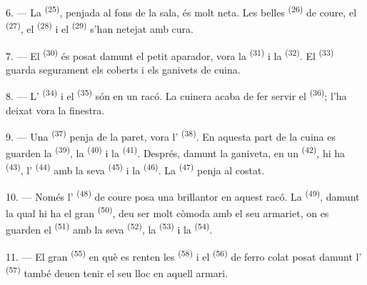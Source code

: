 \VUsaut{4.0mm}
\VUsaut{3.0mm}

6. --- La  \textsuperscript{(25)}, penjada al fons de la
sala, és molt neta. Les belles  \textsuperscript{(26)} de coure,
el  \textsuperscript{(27)}, el 
\textsuperscript{(28)} i el  \textsuperscript{(29)} s'han netejat
amb cura.

7. --- El  \textsuperscript{(30)} és posat damunt el petit aparador,
vora la  \textsuperscript{(31)} i la 
\textsuperscript{(32)}. El  \textsuperscript{(33)} guarda
segurament els coberts i els ganivets de cuina.

8. --- L' \textsuperscript{(34)} i el 
\textsuperscript{(35)} són en un racó. La cuinera acaba de fer servir el
 \textsuperscript{(36)}; l'ha deixat vora la finestra.

9. --- Una  \textsuperscript{(37)} penja de la paret,
vora l' \textsuperscript{(38)}. En aquesta part de la cuina es
guarden la  \textsuperscript{(39)}, la 
\textsuperscript{(40)} i la  \textsuperscript{(41)}.
Després, damunt la ganiveta, en un  \textsuperscript{(42)}, hi
ha  \textsuperscript{(43)}, l'
\textsuperscript{(44)} amb la seva  \textsuperscript{(45)} i la
 \textsuperscript{(46)}. La 
\textsuperscript{(47)} penja al costat.

10. --- Només l' \textsuperscript{(48)} de coure posa una brillantor
en aquest racó. La  \textsuperscript{(49)}, damunt la qual hi ha el
gran  \textsuperscript{(50)}, deu ser molt còmoda amb el seu
armariet, on es guarden el  \textsuperscript{(51)} amb
la seva  \textsuperscript{(52)}, la  \textsuperscript{(53)} i la 
\textsuperscript{(54)}.

\VUsaut{4.0mm}
\VUsaut{3.0mm}

11. --- El gran  \textsuperscript{(55)} en què es renten les
 \textsuperscript{(58)} i el 
\textsuperscript{(56)} de ferro colat posat damunt l'
\textsuperscript{(57)} també deuen tenir el seu lloc en aquell armari.

